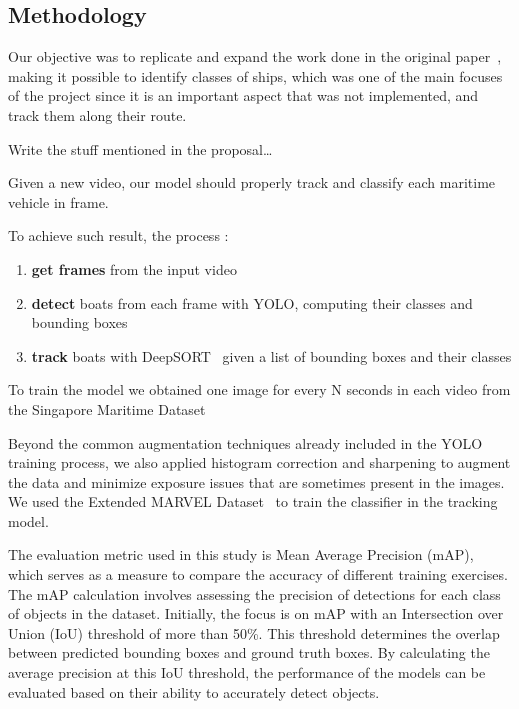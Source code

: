 \documentclass[a4paper,12pt]{article}
\begin{document}
\begin{multicols}{2}
\section{Methodology}\label{sec:methodology}
Our objective was to replicate and expand the work done in the original paper~\cite{MVDTHME}, making it possible to identify classes of ships, which was one of the main focuses of the project since it is an important aspect that was not implemented, and track them along their route.

\hfill\newline
Write the stuff mentioned in the proposal\ldots %
\hfill\newline

Given a new video, our model should properly track and classify each maritime vehicle in frame.

To achieve such result, the process :
\begin{enumerate}
    \item \textbf{get frames} from the input video
    \item \textbf{detect} boats from each frame with YOLO, computing their classes and bounding boxes
    \item \textbf{track} boats with DeepSORT~\cite{DEEPSORT} given a list of bounding boxes and their classes
\end{enumerate}

To train the model we obtained one image for every N seconds in each video from the Singapore Maritime Dataset~\cite{SINGAPORE}

Beyond the common augmentation techniques already included in the YOLO training process, we also applied histogram correction and sharpening to augment the data and minimize exposure issues that are sometimes present in the images.
We used the Extended MARVEL Dataset~\cite{MARVEL} to train the classifier in the tracking model.

The evaluation metric used in this study is Mean Average Precision (mAP), which serves as a measure to compare the accuracy of different training exercises.
The mAP calculation involves assessing the precision of detections for each class of objects in the dataset.
Initially, the focus is on mAP with an Intersection over Union (IoU) threshold of more than 50\%.
This threshold determines the overlap between predicted bounding boxes and ground truth boxes.
By calculating the average precision at this IoU threshold, the performance of the models can be evaluated based on their ability to accurately detect objects.


\end{multicols}
\end{document}
